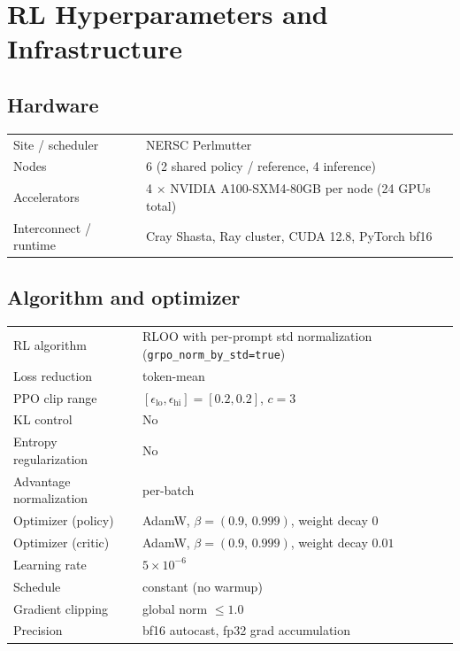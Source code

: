 \documentclass{llmxive}
\begin{document}
\section{RL Hyperparameters and Infrastructure}
\label{app:rl-hparams}

\subsection{Hardware}

\begin{tabular}{ll}
\toprule
Site / scheduler        & NERSC Perlmutter \\
Nodes                   & 6 (2 shared policy / reference, 4 inference) \\
Accelerators            & 4 $\times$ NVIDIA A100-SXM4-80GB per node (24 GPUs total) \\
Interconnect / runtime  & Cray Shasta, Ray cluster, CUDA 12.8, PyTorch bf16 \\
\bottomrule
\end{tabular}

\subsection{Algorithm and optimizer}

\begin{tabular}{ll}
\toprule
RL algorithm                       & RLOO with per-prompt std normalization (\texttt{grpo\_norm\_by\_std=true}) \\
Loss reduction                     & token-mean \\
PPO clip range                     & $[\epsilon_{\text{lo}}, \epsilon_{\text{hi}}] = [0.2, 0.2]$, $c=3$ \\
KL control                         & No \\
Entropy regularization             & No \\
Advantage normalization            & per-batch \\
\midrule
Optimizer (policy)                 & AdamW, $\beta=(0.9,\,0.999)$, weight decay $0$ \\
Optimizer (critic)                 & AdamW, $\beta=(0.9,\,0.999)$, weight decay $0.01$ \\
Learning rate                      & $5 \times 10^{-6}$ \\
Schedule                           & constant (no warmup) \\
Gradient clipping                  & global norm $\le 1.0$ \\
Precision                          & bf16 autocast, fp32 grad accumulation \\
\bottomrule
\end{tabular}
\end{document}
